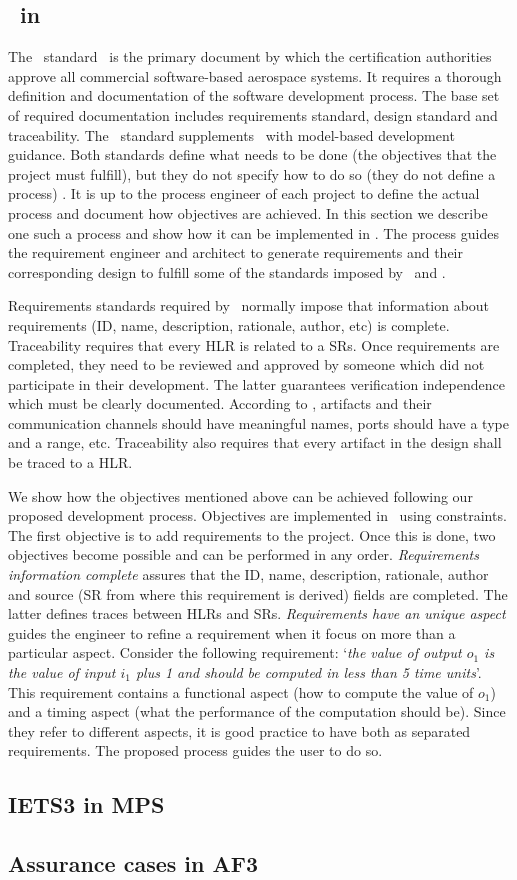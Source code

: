 
\subsection{\doone\ in \afthree}

The \doone\ standard~\cite{do178c} is the primary document by which the certification authorities approve all commercial software-based aerospace systems.
It requires a thorough definition and documentation of the software development process. 
The base set of required documentation includes requirements standard, design standard and traceability.
The \dothree\ standard supplements \doone\ with model-based development guidance.
Both standards define what needs to be done (the objectives that the project must fulfill), but they do not specify how to do so (they do not define a process) .
It is up to the process engineer of each project to define the actual process and document how objectives are achieved.
In this section we describe one such a process and show how it can be implemented in \afthree.
The process guides the requirement engineer and architect to generate requirements and their corresponding design to fulfill some of the standards imposed by \doone\ and \dothree.

Requirements standards required by \doone\ normally impose that information about requirements (ID, name, description, rationale, author, etc) is complete.
Traceability requires that every HLR is related to a SRs.
Once requirements are completed, they need to be reviewed and approved by someone which did not participate in their development. 
The latter guarantees verification independence~\cite{cast26} which must be clearly documented.
According to \dothree, artifacts and their communication channels should have meaningful names, ports should have a type and a range, etc.
Traceability also requires that every artifact in the design shall be traced to a HLR.

We show how the objectives mentioned above can be achieved following our proposed development process.
Objectives are implemented in \afthree\ using constraints.
The first objective is to add requirements to the project. 
Once this is done, two objectives become possible and can be performed in any order. 
\emph{Requirements information complete} assures that the ID, name, description, rationale, author and source (SR from where this requirement is derived) fields are completed. 
The latter defines traces between HLRs and SRs.
\emph{Requirements have an unique aspect} guides the engineer to refine a requirement when it focus on more than a particular aspect.
Consider the following requirement: `\emph{the value of output $o_1$ is the value of input $i_1$ plus 1 and should be computed in less than 5 time units}'.
This requirement contains a functional aspect (how to compute the value of $o_1$) and a timing aspect (what the performance of the computation should be).
Since they refer to different aspects, it is good practice to have both as separated requirements.
The proposed process guides the user to do so.

\subsection{IETS3 in MPS}

\subsection{Assurance cases in AF3}
